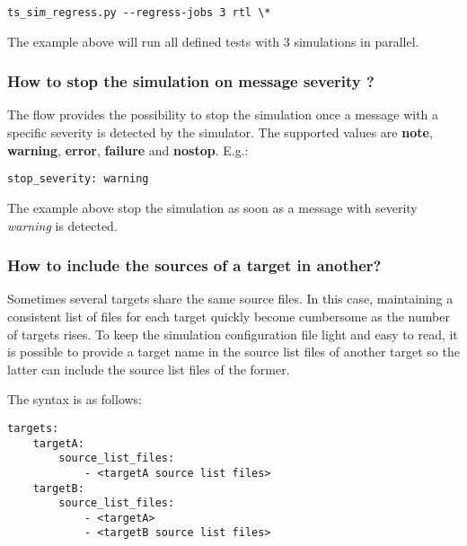 \documentclass{tropic_design_spec}
\begin{document}
\begin{lstlisting}
ts_sim_regress.py --regress-jobs 3 rtl \*
\end{lstlisting}

The example above will run all defined tests with 3 simulations in parallel.


\subsubsection{How to stop the simulation on message severity ?}
\label{sec:how-to-stop-the-simulation-on-message-severity}

The flow provides the possibility to stop the simulation once a message with a specific
severity is detected by the simulator. The supported values are \textbf{note},
\textbf{warning}, \textbf{error}, \textbf{failure} and \textbf{nostop}. E.g.:

\begin{lstlisting}
stop_severity: warning
\end{lstlisting}

The example above stop the simulation as soon as a message with severity
\textit{warning} is detected.


\subsubsection{How to include the sources of a target in another?}
\label{sec:how-to-include-the-sources-of-a-target-in-another}

Sometimes several targets share the same source files. In this case, maintaining a
consistent list of files for each target quickly become cumbersome as the number of
targets rises. To keep the simulation configuration file light and easy to read, it is
possible to provide a target name in the source list files of another target so the
latter can include the source list files of the former.

The syntax is as follows:
\begin{lstlisting}
targets:
    targetA:
        source_list_files:
            - <targetA source list files>
    targetB:
        source_list_files:
            - <targetA>
            - <targetB source list files>
\end{lstlisting}
\end{document}

